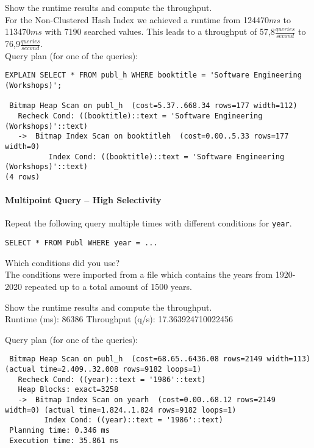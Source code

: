 \documentclass[11pt]{scrartcl}
\begin{document}
\smallskip\noindent
Show the runtime results and compute the throughput.\\
For the Non-Clustered Hash Index we achieved a runtime from 124470$ms$ to 113470$ms$ with 7190 searched values.
This leads to a throughput of 57,8$\frac{queries}{second}$ to 76,9$\frac{queries}{second}$.\\

\smallskip\noindent
Query plan (for one of the queries):
\begin{verbatim}
EXPLAIN SELECT * FROM publ_h WHERE booktitle = 'Software Engineering (Workshops)';

 Bitmap Heap Scan on publ_h  (cost=5.37..668.34 rows=177 width=112)
   Recheck Cond: ((booktitle)::text = 'Software Engineering (Workshops)'::text)
   ->  Bitmap Index Scan on booktitleh  (cost=0.00..5.33 rows=177 width=0)
          Index Cond: ((booktitle)::text = 'Software Engineering (Workshops)'::text)
(4 rows)
\end{verbatim}


\paragraph{Multipoint Query -- High Selectivity}

Repeat the following query multiple times with different conditions for {\tt year}.

{\small
\begin{verbatim}
SELECT * FROM Publ WHERE year = ...
\end{verbatim}
}

\noindent
Which conditions did you use?\\
The conditions were imported from a file which contains the years from 1920-2020 repeated up to a total amount of 1500 years.

\smallskip\noindent
Show the runtime results and compute the throughput.\\
Runtime (ms): 86386
Throughput (q/s): 17.363924710022456

\smallskip\noindent
Query plan (for one of the queries):
{\small
\begin{verbatim}
 Bitmap Heap Scan on publ_h  (cost=68.65..6436.08 rows=2149 width=113) (actual time=2.409..32.008 rows=9182 loops=1)
   Recheck Cond: ((year)::text = '1986'::text)
   Heap Blocks: exact=3258
   ->  Bitmap Index Scan on yearh  (cost=0.00..68.12 rows=2149 width=0) (actual time=1.824..1.824 rows=9182 loops=1)
         Index Cond: ((year)::text = '1986'::text)
 Planning time: 0.346 ms
 Execution time: 35.861 ms
\end{verbatim}
}
\end{document}

